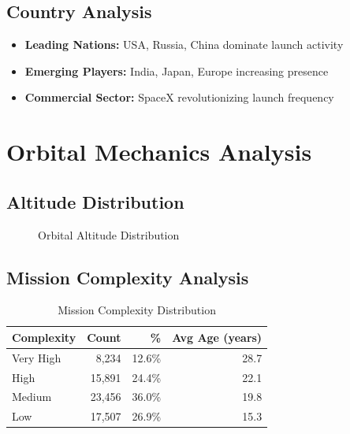 \documentclass[12pt,a4paper]{article}
\begin{document}
\subsection{Country Analysis}
\begin{itemize}
    \item \textbf{Leading Nations:} USA, Russia, China dominate launch activity
    \item \textbf{Emerging Players:} India, Japan, Europe increasing presence
    \item \textbf{Commercial Sector:} SpaceX revolutionizing launch frequency
\end{itemize}

\section{Orbital Mechanics Analysis}

\subsection{Altitude Distribution}
\begin{figure}[H]
    \centering
    \caption{Orbital Altitude Distribution}
\end{figure}

\subsection{Mission Complexity Analysis}
\begin{table}[H]
\centering
\begin{tabular}{@{}lrrr@{}}
\toprule
\textbf{Complexity} & \textbf{Count} & \textbf{\%} & \textbf{Avg Age (years)} \\
\midrule
Very High & 8,234 & 12.6\% & 28.7 \\
High & 15,891 & 24.4\% & 22.1 \\
Medium & 23,456 & 36.0\% & 19.8 \\
Low & 17,507 & 26.9\% & 15.3 \\
\bottomrule
\end{tabular}
\caption{Mission Complexity Distribution}
\end{table}
\end{document}
